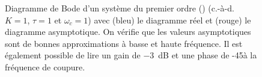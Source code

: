 \afterpage{\clearpage}
\begin{figure}[!t]
\centering
{}



\caption{Diagramme de Bode d'un système du premier ordre 
         () (c.-à-d. $K=1$, $\tau=1$ et $\omega_c=1$) avec 
         (bleu) le diagramme réel et (rouge) le diagramme asymptotique. On 
         vérifie que les valeurs asymptotiques sont de bonnes approximations 
         à basse et haute fréquence. Il est également possible de lire un 
         gain de \SI{-3}{\dB} et une phase de -45\degreeSI à la fréquence 
         de coupure.\label{fig-bode_1er_3}}
\end{figure}
